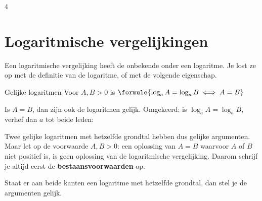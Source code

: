 \begin{alleenvoor}{4}
\section{Logaritmische vergelijkingen}

Een logaritmische vergelijking heeft de onbekende onder een logaritme. Je lost ze op met de definitie van de logaritme, of met de volgende eigenschap.

\begin{theorie}
\begin{stelling}{Gelijke logaritmen}
Voor $A, B > 0$ is \qquad $\formule{\log_a A = \log_a B \iff A = B}$
\end{stelling}
\begin{bewijs}
Is $A = B$, dan zijn ook de logaritmen gelijk. Omgekeerd: is $\log_a A = \log_a B$, verhef dan $a$ tot beide leden:
\end{bewijs}
\end{theorie}

Twee gelijke logaritmen met hetzelfde grondtal hebben dus gelijke argumenten. Maar let op de voorwaarde $A, B > 0$: een oplossing van $A = B$ waarvoor $A$ of $B$ niet positief is, is geen oplossing van de logaritmische vergelijking. Daarom schrijf je altijd eerst de \textbf{bestaansvoorwaarden} op.


\begin{oefeningen}
\end{oefeningen}

Staat er aan beide kanten een logaritme met hetzelfde grondtal, dan stel je de argumenten gelijk.



\end{alleenvoor}
